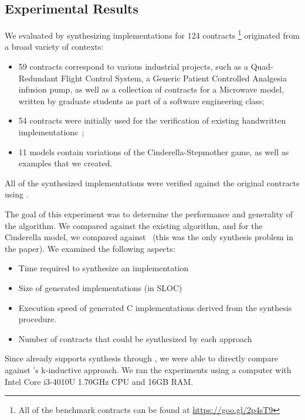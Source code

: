 \subsection{Experimental Results}
\label{sec:results}

We evaluated \jsynvg by synthesizing implementations
for 124 contracts%
\footnote{All of the benchmark contracts can be found at
\url{https://goo.gl/2p4sT9}}
originated from a broad variety of contexts:
\begin{itemize}
\item 59 contracts correspond to various industrial projects, such as a Quad-Redundant Flight Control System, a Generic Patient Controlled Analgesia infusion pump, as well as a collection of contracts
for a Microwave model, written by graduate students as part of a software
engineering class;
\item 54 contracts were initially used for the verification of existing handwritten implementations~\cite{hagen2008scaling};
\item 11 models contain variations of the
Cinderella-Stepmother game, as well as examples that we created.
\end{itemize}
All of the synthesized implementations were verified against the original contracts using \jkind.

The goal of this experiment was to determine the performance and generality of the \jsynvg algorithm.  We compared against the existing \jsyn algorithm, and for the Cinderella model, we compared against~\cite{beyene2014constraint} (this was the only synthesis problem in the paper).  We examined the following aspects: 
\begin{itemize}
    \item Time required to synthesize an implementation
    \item Size of generated implementations (in SLOC)
    \item Execution speed of generated C implementations derived from the synthesis procedure.
    \item Number of contracts that could be synthesized by each approach
\end{itemize}
\noindent Since \jkind already supports synthesis through \jsyn, we were able to directly
compare \jsynvg against \jsyn's k-inductive approach. We
ran the experiments using a computer with Intel Core i3-4010U 1.70GHz CPU and
16GB RAM.

